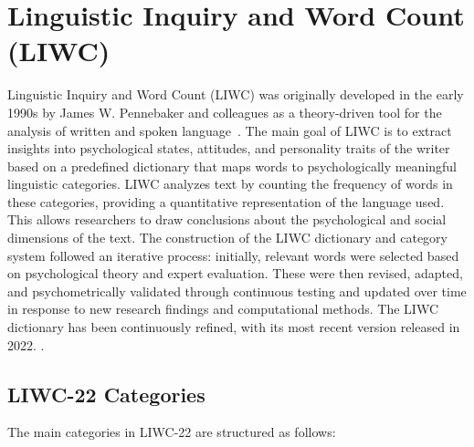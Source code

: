 \section{Linguistic Inquiry and Word Count (LIWC)}


Linguistic Inquiry and Word Count (LIWC) was originally developed in the early 1990s by James W. Pennebaker and colleagues as a theory-driven tool for the analysis of written and spoken language~\cite{tausczik2010psychological}. 
The main goal of LIWC is to extract insights into psychological states, attitudes, and personality traits of the writer based on a predefined dictionary that maps words to psychologically meaningful linguistic categories. LIWC analyzes text by counting the frequency of words in these categories, providing a quantitative representation of the language used. This allows researchers to draw conclusions about the psychological and social dimensions of the text.
The construction of the LIWC dictionary and category system followed an iterative process: initially, relevant words were selected based on psychological theory and expert evaluation. These were then revised, adapted, and psychometrically validated through continuous testing and updated over time in response to new research findings and computational methods. The LIWC dictionary has been continuously refined, with its most recent version released in 2022. \parencite{pennebaker2022liwc}.


\subsection{LIWC-22 Categories}
The main categories in LIWC-22 are structured as follows:

